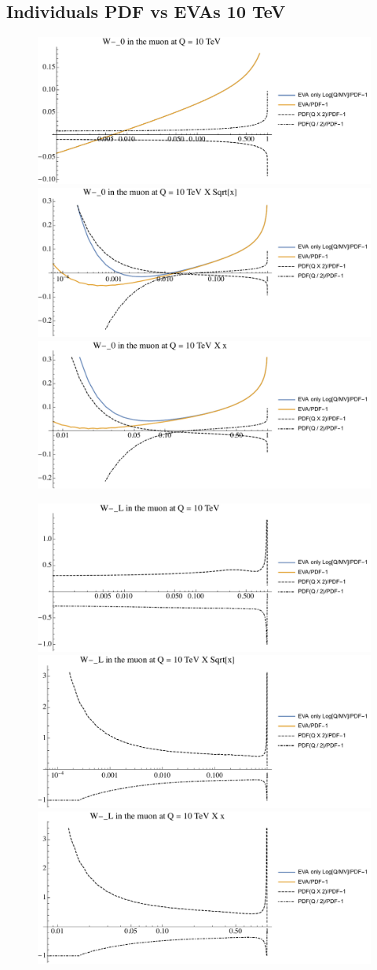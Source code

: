 \documentclass[a4paper,11pt]{article}
\begin{document}
\clearpage
\subsection{Individuals PDF vs EVAs 10 TeV}

\begin{figure}[ht]
\includegraphics[width=0.46\linewidth]{Notebooks/PlotPDFs/ratios/10TeV/W-_0_Q.pdf}
\includegraphics[width=0.46\linewidth]{Notebooks/PlotPDFs/ratios/10TeV/W-_0_Qsqrtx.pdf}
\includegraphics[width=0.46\linewidth]{Notebooks/PlotPDFs/ratios/10TeV/W-_0_Qx.pdf}
\end{figure}

\begin{figure}[ht]
\includegraphics[width=0.46\linewidth]{Notebooks/PlotPDFs/ratios/10TeV/W-_L_Q.pdf}
\includegraphics[width=0.46\linewidth]{Notebooks/PlotPDFs/ratios/10TeV/W-_L_Qsqrtx.pdf}
\includegraphics[width=0.46\linewidth]{Notebooks/PlotPDFs/ratios/10TeV/W-_L_Qx.pdf}
\end{figure}
\end{document}
